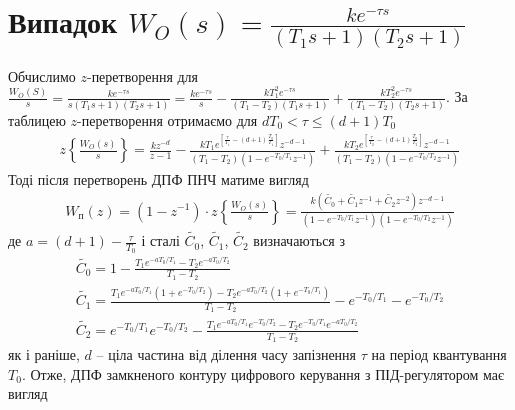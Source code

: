 \section{Випадок \texorpdfstring{$W_O(s) = \frac{k e^{-\tau s}}{(T_1 s + 1)(T_2 s + 1)}$}{4}}
Обчислимо $z$-перетворення для $\frac{W_O(S)}{s} = \frac{k e^{-\tau s}}{s(T_1 s + 1)(T_2 s + 1)} = 
\frac{k e^{-\tau s}}{s} - \frac{k T_1^2 e^{-\tau s}}{(T_1 - T_2) (T_1 s + 1)} + \frac{k T_2^2 e^{-\tau s}}{(T_1 - T_2) (T_2 s + 1)}$.
За таблицею $z$-перетворення отримаємо для $d T_0 < \tau \leq (d+1)T_0$
\begin{gather}
    z\left\{\frac{W_O(s)}{s} \right\} = \frac{k z^{-d}}{z - 1} - 
    \frac{k T_1 e^{\left[
        \frac{\tau}{T_1} - (d+1) \frac{T_0}{T_1}
     \right]} z^{-d-1}}
    {
        (T_1 - T_2) \left(1 - e^{-T_0 / T_1} z^{-1}\right)
    } +
    \frac{k T_2 e^{\left[
        \frac{\tau}{T_2} - (d+1) \frac{T_0}{T_2}
     \right]} z^{-d-1}}
    {
        (T_1 - T_2) \left(1 - e^{-T_0 / T_2} z^{-1}\right)
    } 
\end{gather}
Тоді після перетворень ДПФ ПНЧ матиме вигляд
\begin{gather}
    W_{\text{п}}(z) = \left(1 - z^{-1}\right) \cdot z\left\{\frac{W_O(s)}{s} \right\} = 
    \frac{
        k \left(\tilde{C_0} + \tilde{C_1} z^{-1} + \tilde{C_2} z^{-2}\right) z^{-d-1}
    }{
        \left(1 - e^{-T_0 / T_1} z^{-1}\right)
        \left(1 - e^{-T_0 / T_2} z^{-1}\right)
    }
\end{gather}
де $a = (d+1) - \frac{\tau}{T_0}$ і сталі $\tilde{C_0}$, $\tilde{C_1}$, $\tilde{C_2}$ визначаються з
\begin{gather*}
    \tilde{C_0} = 1 - \frac{
        T_1 e^{- a T_0 / T_1} - 
        T_2 e^{- a T_0 / T_2}
    }{T_1 - T_2} \\
    \tilde{C_1} = 
    \frac{
        T_1 e^{- a T_0 / T_1} \left(1 + e^{- T_0 / T_2}\right) - 
        T_2 e^{- a T_0 / T_2} \left(1 + e^{- T_0 / T_1}\right)
    }{
        T_1 - T_2 
    } - e^{-T_0 / T_1} - e^{-T_0 / T_2} \\
    \tilde{C_2} = 
    e^{- T_0 / T_1} e^{- T_0 / T_2} - 
    \frac{
        T_1 e^{- a T_0/ T_1} e^{-T_0 / T_2} - 
        T_2 e^{-T_0 / T_1} e^{- a T_0 / T_2}
    }{
        T_1 - T_2
    }
\end{gather*}
як і раніше, $d$ -- ціла частина від ділення часу запізнення $\tau$ на період квантування
$T_0$. Отже, ДПФ замкненого контуру цифрового керування з ПІД-регулятором має вигляд
